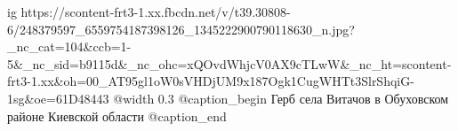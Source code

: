  
 
 
 
 

\ifcmt
  ig https://scontent-frt3-1.xx.fbcdn.net/v/t39.30808-6/248379597_6559754187398126_1345222900790118630_n.jpg?_nc_cat=104&ccb=1-5&_nc_sid=b9115d&_nc_ohc=xQOvdWhjcV0AX9cTLwW&_nc_ht=scontent-frt3-1.xx&oh=00_AT95gl1oW0sVHDjUM9x187Ogk1CugWHTt3SlrShqiG-1sg&oe=61D48443
  @width 0.3
	@caption_begin
	  Герб села Витачов в Обуховском районе Киевской области
	@caption_end
\fi

